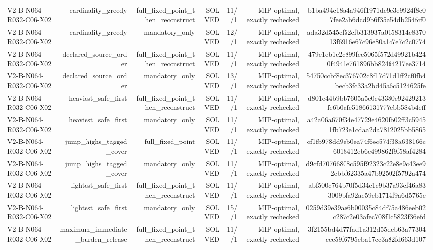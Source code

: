 {\begin{longtable}{lrrrrrr}
V2-B-N064-R032-C06-X02 & cardinality\_greedy & full\_fixed\_point\_then\_reconstruct & SOLVED & 11//1 & MIP-optimal, exactly rechecked & b1ba494c18a4a946f1971de9c3e9924f8c07fee2ab6dcd9b6f35a54db254fcf0 \\
V2-B-N064-R032-C06-X02 & cardinality\_greedy & mandatory\_only & SOLVED & 12//1 & MIP-optimal, exactly rechecked & ada32d545cf52cfb313937a0158314c837013f6916e67c96e80a1c7e7c2c0774 \\
V2-B-N064-R032-C06-X02 & declared\_source\_order & full\_fixed\_point\_then\_reconstruct & SOLVED & 11//1 & MIP-optimal, exactly rechecked & 479e1eb1c2c899fec5065f572d49921b4240f4941e761896bb82464217ee3714 \\
V2-B-N064-R032-C06-X02 & declared\_source\_order & mandatory\_only & SOLVED & 13//1 & MIP-optimal, exactly rechecked & 54750ccbf8ec376702c8f17d71d1ff2cf0fb4becb3fc33a2bd45a6c5124625fe \\
V2-B-N064-R032-C06-X02 & heaviest\_safe\_first & full\_fixed\_point\_then\_reconstruct & SOLVED & 11//1 & MIP-optimal, exactly rechecked & d801e44b9bb7605a5e0c43380e92429213fe6b0afe51866131777ebb584b4eff \\
V2-B-N064-R032-C06-X02 & heaviest\_safe\_first & mandatory\_only & SOLVED & 11//1 & MIP-optimal, exactly rechecked & a42a06a670f34e47729e4620fb02ff3c59451fb723e1cdaa2da7812025bb5865 \\
V2-B-N064-R032-C06-X02 & jump\_highs\_tagged\_cover & full\_fixed\_point & SOLVED & 11//1 & MIP-optimal, exactly rechecked & cf1fb978dd9eb0ea74f6ec574f38a638166c6018412eb6e499862f9f58af4284 \\
V2-B-N064-R032-C06-X02 & jump\_highs\_tagged\_cover & mandatory\_only & SOLVED & 11//1 & MIP-optimal, exactly rechecked & d9cfd70766808c595f92323c22e8e9c43ee92ebbf62335a47b92502f5792a474 \\
V2-B-N064-R032-C06-X02 & lightest\_safe\_first & full\_fixed\_point\_then\_reconstruct & SOLVED & 11//1 & MIP-optimal, exactly rechecked & abf500c764b70f5d34c1c9b37a93cf46a833009bfa92ae59eb1714f9a6d5765e \\
V2-B-N064-R032-C06-X02 & lightest\_safe\_first & mandatory\_only & SOLVED & 15//1 & MIP-optimal, exactly rechecked & 0259d39e39ae6b00035c84df75a486eeb02c287c2e03afec708f1c5823f36efd \\
V2-B-N064-R032-C06-X02 & maximum\_immediate\_burden\_release & full\_fixed\_point\_then\_reconstruct & SOLVED & 11//1 & MIP-optimal, exactly rechecked & 3f2155bd4d77fad1a312d55dcb63a77304cee59f6795eba17cc3a82fd663d107 \\

\end{longtable}}
